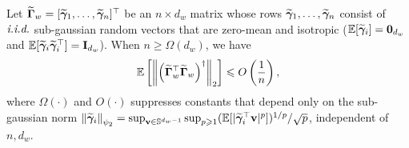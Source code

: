 \begin{lemma}\label{lem:trace_inv_subgaussian}
    Let $\widetilde{\boldsymbol{\Gamma}}_w = [\widetilde{\boldsymbol{\gamma}}_1, \ldots, \widetilde{\boldsymbol{\gamma}}_n]^\top$ be an $n \times d_w$ matrix whose rows $\widetilde{\boldsymbol{\gamma}}_1, \ldots, \widetilde{\boldsymbol{\gamma}}_n$ consist of $\emph{i.i.d.}$ sub-gaussian random vectors that are zero-mean and isotropic (\ie $\mathbb{E}[\widetilde{\boldsymbol{\gamma}}_i] = \textbf0_{d_w}$ and $\mathbb{E}[\widetilde{\boldsymbol{\gamma}}_i \widetilde{\boldsymbol{\gamma}}_i^\top] = \mathbf{I}_{d_w}$). When $n \ge \Omega(d_w)$, we have
    \begin{align*}
        \mathbb{E}\left[\left\|\left(\widetilde{\boldsymbol{\Gamma}}_w^\top \widetilde{\boldsymbol{\Gamma}}_w\right)^\dagger\right\|_2\right] \leqslant O\left(\frac{1}{n}\right),
    \end{align*}
    where $\Omega(\cdot)$ and $O(\cdot)$ suppresses constants that depend only on the sub-gaussian norm $\left\|\widetilde{\boldsymbol{\gamma}}_i\right\|_{\psi_2} = \sup_{\mathbf{v} \in \mathbb{S}^{d_w-1}} \sup_{p \geqslant 1} (\mathbb{E}[|\widetilde{\boldsymbol{\gamma}}_i^\top \mathbf{v}|^p])^{1/p} / \sqrt{p}$, independent of $n, d_w$.
\end{lemma}

